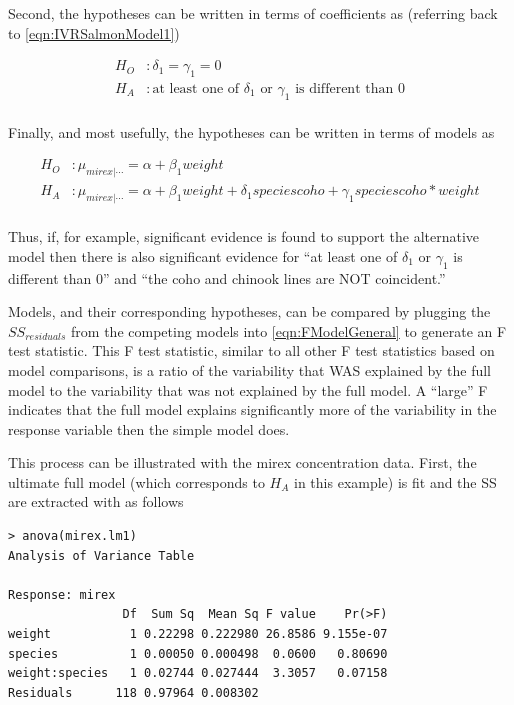 \documentclass[10pt,openany]{book}\usepackage[]{graphicx}\usepackage[]{color}
\makeatletter
\newenvironment{kframe}{%
 \def\at@end@of@kframe{}%
 \ifinner\ifhmode%
  \def\at@end@of@kframe{\end{minipage}}%
  \begin{minipage}{\columnwidth}%
 \fi\fi%
 \def\FrameCommand##1{\hskip\@totalleftmargin \hskip-\fboxsep
 \colorbox{shadecolor}{##1}\hskip-\fboxsep
     \hskip-\linewidth \hskip-\@totalleftmargin \hskip\columnwidth}%
 \MakeFramed {\advance\hsize-\width
   \@totalleftmargin\z@ \linewidth\hsize
   \@setminipage}}%
 {\par\unskip\endMakeFramed%
 \at@end@of@kframe}
\newenvironment{knitrout}{}{} %
\makeatother
\begin{document}
Second, the hypotheses can be written in terms of coefficients as (referring back to \eqref{eqn:IVRSalmonModel1})

\[ \begin{split}
  H_{O}&: \delta_{1} = \gamma_{1} = 0 \\
  H_{A}&: \text{at least one of $\delta_{1}$ or $\gamma_{1}$ is different than 0} \\
\end{split} \]

Finally, and most usefully, the hypotheses can be written in terms of models as

\[ \begin{split}
  H_{O}&: \mu_{mirex|\cdots} = \alpha+\beta_{1}weight \\
  H_{A}&: \mu_{mirex|\cdots} = \alpha+\beta_{1}weight+\delta_{1}speciescoho+\gamma_{1}speciescoho*weight \\
\end{split} \]

Thus, if, for example, significant evidence is found to support the alternative model then there is also significant evidence for ``at least one of $\delta_{1}$ or $\gamma_{1}$ is different than 0'' and ``the coho and chinook lines are NOT coincident.''

Models, and their corresponding hypotheses, can be compared by plugging the $SS_{residuals}$ from the competing models into \eqref{eqn:FModelGeneral} to generate an F test statistic.  This F test statistic, similar to all other F test statistics based on model comparisons, is a ratio of the variability that WAS explained by the full model to the variability that was not explained by the full model.  A ``large'' F indicates that the full model explains significantly more of the variability in the response variable then the simple model does.

This process can be illustrated with the mirex concentration data.  First, the ultimate full model (which corresponds to $H_{A}$ in this example) is fit and the SS are extracted with  as follows

\begin{knitrout}
\color{fgcolor}\begin{kframe}
\begin{verbatim}
> anova(mirex.lm1)
Analysis of Variance Table

Response: mirex
                Df  Sum Sq  Mean Sq F value    Pr(>F)
weight           1 0.22298 0.222980 26.8586 9.155e-07
species          1 0.00050 0.000498  0.0600   0.80690
weight:species   1 0.02744 0.027444  3.3057   0.07158
Residuals      118 0.97964 0.008302                  
\end{verbatim}
\end{kframe}
\end{knitrout}
\end{document}

